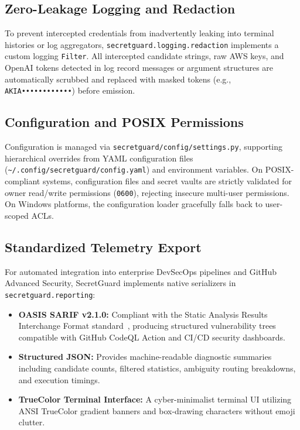\subsection{Zero-Leakage Logging and Redaction}
To prevent intercepted credentials from inadvertently leaking into terminal histories or log aggregators, \texttt{secretguard.logging.redaction} implements a custom logging \texttt{Filter}. All intercepted candidate strings, raw AWS keys, and OpenAI tokens detected in log record messages or argument structures are automatically scrubbed and replaced with masked tokens (e.g., \texttt{AKIA••••••••••••}) before emission.

\subsection{Configuration and POSIX Permissions}
Configuration is managed via \texttt{secretguard/config/settings.py}, supporting hierarchical overrides from YAML configuration files (\texttt{\~{}/.config/secretguard/config.yaml}) and environment variables. On POSIX-compliant systems, configuration files and secret vaults are strictly validated for owner read/write permissions (\texttt{0600}), rejecting insecure multi-user permissions. On Windows platforms, the configuration loader gracefully falls back to user-scoped ACLs.

\subsection{Standardized Telemetry Export}
For automated integration into enterprise DevSecOps pipelines and GitHub Advanced Security, SecretGuard implements native serializers in \texttt{secretguard.reporting}:
\begin{itemize}
    \item \textbf{OASIS SARIF v2.1.0:} Compliant with the Static Analysis Results Interchange Format standard~\cite{oasis2020sarif}, producing structured vulnerability trees compatible with GitHub CodeQL Action and CI/CD security dashboards.
    \item \textbf{Structured JSON:} Provides machine-readable diagnostic summaries including candidate counts, filtered statistics, ambiguity routing breakdowns, and execution timings.
    \item \textbf{TrueColor Terminal Interface:} A cyber-minimalist terminal UI utilizing ANSI TrueColor gradient banners and box-drawing characters without emoji clutter.
\end{itemize}
